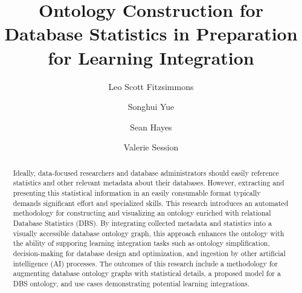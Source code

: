 \documentclass[sigconf]{acmart}
\begin{document}
\title{Ontology Construction for Database Statistics in Preparation for Learning Integration}

\author{Leo Scott Fitzsimmons}

\author{Songhui Yue}

\author{Sean Hayes}
	
\author{Valerie Session}


\renewcommand{\shortauthors}{Trovato et al.}

\begin{abstract}
Ideally, data-focused researchers and database administrators should easily reference statistics and other relevant metadata about their databases. However, extracting and presenting this statistical information in an easily consumable format typically demands significant effort and specialized skills. This research introduces an automated methodology for constructing and visualizing an ontology enriched with relational Database Statistics (DBS). By integrating collected metadata and statistics into a visually accessible database ontology graph, this approach enhances the ontology with the ability of supporing learning integration tasks such as ontology simplification, decision-making for database design and optimization, and ingestion by other artificial intelligence (AI) processes. The outcomes of this research include a methodology for augmenting database ontology graphs with statistical details, a proposed model for a DBS ontology, and use cases demonstrating potential learning integrations.
\end{abstract}
\end{document}
